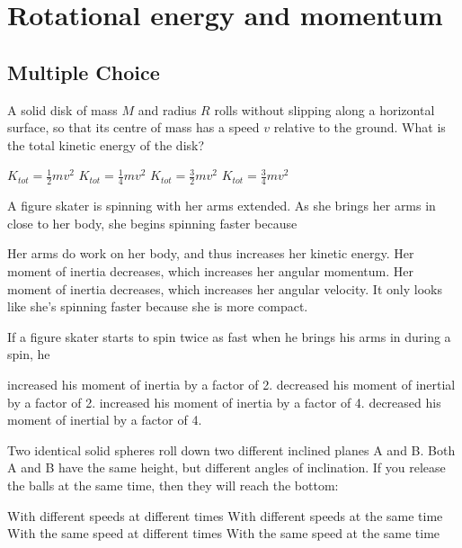 \section{Rotational energy and momentum}

\subsection{Multiple Choice}

\question A solid disk of mass $M$ and radius $R$ rolls without slipping along a horizontal surface, so that its centre of mass has a speed $v$ relative to the ground. What is the total kinetic energy of the disk?
\begin{checkboxes} 
	\choice $K_{tot}=\frac{1}{2}mv^2$ 
	\choice  $K_{tot}=\frac{1}{4}mv^2$ 
	\choice $K_{tot}=\frac{3}{2}mv^2$ 
	\CorrectChoice $K_{tot}=\frac{3}{4}mv^2$ 
\end{checkboxes}

\question A figure skater is spinning with her arms extended. As she brings her arms in close to her body, she begins spinning faster because
\begin{checkboxes}
\choice Her arms do work on her body, and thus increases her kinetic energy.
\choice Her moment of inertia decreases, which increases her angular momentum.
\CorrectChoice Her moment of inertia decreases, which increases her angular velocity. \correct
\choice It only looks like she's spinning faster because she is more compact.
\end{checkboxes}

\question If a figure skater starts to spin twice as fast when he brings his arms in during a spin, he 
\begin{choices} 
	\choice increased his moment of inertia by a factor of 2.
	\CorrectChoice  decreased his moment of inertial by a factor of 2.
	\choice  increased his moment of inertia by a factor of 4.
	\choice decreased his moment of inertial by a factor of 4.
\end{choices}

\question Two identical solid spheres roll down two different inclined planes A and B. Both A and B have the same height, but different angles of inclination. If you release the balls at the same time, then they will reach the bottom:
\begin{checkboxes}
\choice With different speeds at different times
\choice With different speeds at the same time
\CorrectChoice With the same speed at different times \correct
\choice With the same speed at the same time
\end{checkboxes}

